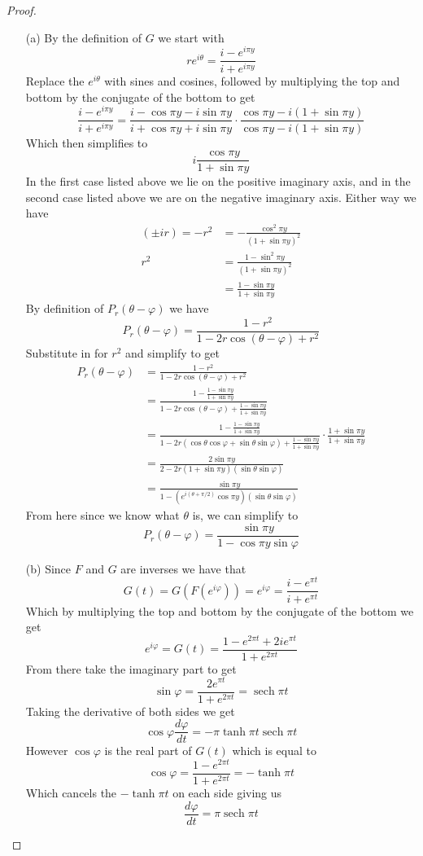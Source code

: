 \documentclass[10pt]{article}
\DeclareMathOperator{\sech}{sech}
\theoremstyle{remark}
\theoremstyle{remark}
\begin{document}
\begin{proof}
  \begin{enumerate}
  \item[(a)] By the definition of $G$ we start with
    \[
      re^{i\theta}=\frac{i-e^{i\pi y}}{i+e^{i\pi y}}
    \]
    Replace the $e^{i\theta}$ with sines and cosines, followed by multiplying the top and
    bottom by the conjugate of the bottom to get
    \[
      \frac{i-e^{i\pi y}}{i+e^{i\pi y}}=\frac{i-\cos\pi y-i\sin\pi y}{i+\cos\pi y+i\sin\pi y}\cdot\frac{\cos\pi y-i(1+\sin\pi y)}{\cos\pi y-i(1+\sin\pi y)}
    \]
    Which then simplifies to
    \[
      i\frac{\cos\pi y}{1+\sin\pi y}
    \]
    In the first case listed above we lie on the positive imaginary axis, and in the second case listed
    above we are on the negative imaginary axis. Either way we have
    \begin{align*}
      (\pm i r)=-r^2&= -\frac{\cos^2\pi y}{(1+\sin\pi y)^2}\\
      r^2 &= \frac{1-\sin^2\pi y}{(1+\sin\pi y)^2}\\
                 &= \frac{1-\sin\pi y}{1+\sin \pi y}
    \end{align*}
    By definition of $P_r(\theta-\varphi)$ we have
    \[
      P_r(\theta-\varphi)=\frac{1-r^2}{1-2r\cos(\theta-\varphi)+r^2}
    \]
    Substitute in for $r^2$ and simplify to get
    \begin{align*}
      P_r(\theta-\varphi)&=\frac{1-r^2}{1-2r\cos(\theta-\varphi)+r^2}\\
             &= \frac{1-\frac{1-\sin\pi y}{1+\sin \pi y}}{1-2r\cos(\theta-\varphi)+\frac{1-\sin\pi y}{1+\sin \pi y}}\\
             &=\frac{1-\frac{1-\sin\pi y}{1+\sin \pi y}}{1-2r(\cos\theta\cos\varphi+\sin\theta\sin\varphi)+\frac{1-\sin\pi y}{1+\sin \pi y}}\cdot\frac{1+\sin\pi y}{1+\sin\pi y}\\
             &=\frac{2\sin\pi y}{2-2r(1+\sin\pi y)(\sin\theta\sin\varphi)}\\
             &=\frac{\sin\pi y}{1-(e^{i(\theta+\pi/2)}\cos\pi y)(\sin\theta\sin\varphi)}
    \end{align*}
    From here since we know what $\theta$ is, we can simplify to
    \[
      P_r(\theta-\varphi)=\frac{\sin\pi y}{1-\cos\pi y\sin\varphi}
    \]
  \item[(b)] Since $F$ and $G$ are inverses we have that
    \[
      G(t)=G(F(e^{i\varphi}))=e^{i\varphi}=\frac{i-e^{\pi t}}{i+e^{\pi t}}
    \]
    Which by multiplying the top and bottom by the conjugate of the bottom we get
    \[
      e^{i\varphi}=G(t)=\frac{1-e^{2\pi t}+2ie^{\pi t}}{1+e^{2\pi t}}
    \]
    From there take the imaginary part to get
    \[
      \sin\varphi = \frac{2e^{\pi t}}{1+e^{2\pi t}}=\sech \pi t
    \]
    Taking the derivative of both sides we get
    \[
      \cos \varphi \frac{d\varphi}{dt}=-\pi\tanh\pi t\sech\pi t
    \]
    However $\cos\varphi$ is the real part of $G(t)$ which is equal to
    \[
      \cos\varphi = \frac{1-e^{2\pi t}}{1+e^{2\pi t}}=-\tanh\pi t
    \]
    Which cancels the $-\tanh\pi t$ on each side giving us
    \[
      \frac{d\varphi}{dt}=\pi\sech\pi t
    \]


\end{enumerate}
\end{proof}
\end{document}
